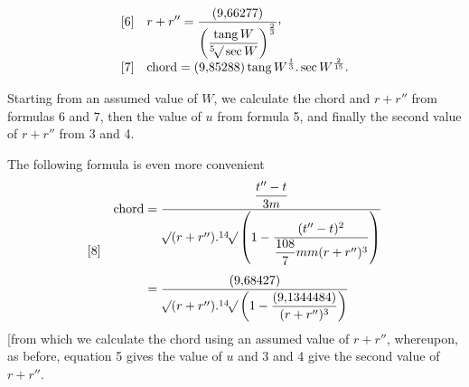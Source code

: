\[
\begin{array}{l@{\quad}l}
[6]&\displaystyle r+r''=\frac{(9{,}66277)}{\left(\dfrac{\operatorname{tang}W}{\BareRoot[5]{\sec W}}\right)^{\frac{2}{3}}}\mathpunct{\raisebox{.45ex}{,}}\\[8pt]
[7]&\displaystyle\text{chord}=(9{,}85288)\operatorname{tang}W^{\frac{1}{3}}\mathord{.}\sec W^{\frac{2}{15}}.
\end{array}
\]

Starting from an assumed value of \(W\), we calculate the chord and \(r+r''\) from formulas 6 and 7, then the value of \(u\) from formula 5, and finally the second value of \(r+r''\) from 3 and 4.

The following formula is even more convenient
\[
\begin{array}{l@{\quad}l}
[8]&\begin{aligned}
\text{chord}&=\frac{\dfrac{t''-t}{3m}}{\BareRoot{(r+r'')}\mathord{.}\BareRoot[14]{\left(1-\dfrac{(t''-t)^2}{\dfrac{108}{7}mm(r+r'')^3}\right)}}\\[5pt]
&=\frac{(9{,}68427)}{\BareRoot{(r+r'')}\mathord{.}\BareRoot[14]{\left(1-\dfrac{(9{,}1344484)}{(r+r'')^3}\right)}}
\end{aligned}
\end{array}
\]
[from which we calculate the chord using an assumed value of \(r+r''\), whereupon, as before, equation 5 gives the value of \(u\) and 3 and 4 give the second value of \(r+r''\).


